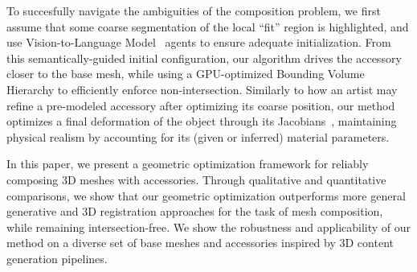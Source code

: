 To succesfully navigate the ambiguities of the composition problem, we first assume that some coarse segmentation of the local ``fit'' region is highlighted, and use Vision-to-Language Model~\cite{gemini} agents to ensure adequate initialization. 
From this semantically-guided initial configuration, our algorithm drives the accessory closer to the base mesh, while using a GPU-optimized Bounding Volume Hierarchy to efficiently enforce non-intersection.
Similarly to how an artist may refine a pre-modeled accessory after optimizing its coarse position, our method optimizes a final deformation of the object through its Jacobians~\cite{aigerman2022neural}, maintaining physical realism by accounting for its (given or inferred) material parameters.










In this paper, we present a geometric optimization framework for reliably composing 3D meshes with accessories.
Through qualitative and quantitative comparisons, we show that our geometric optimization outperforms more general generative and 3D registration approaches for the task of mesh composition, while remaining intersection-free.
We show the robustness and applicability of our method on a diverse set of base meshes and accessories inspired by 3D content generation pipelines.